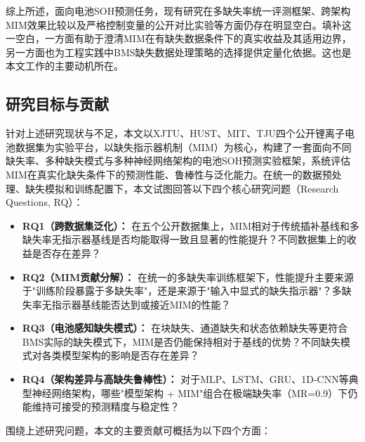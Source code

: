\documentclass[10pt,a4paper]{ctexart}
\begin{document}
综上所述，面向电池SOH预测任务，现有研究在多缺失率统一评测框架、跨架构MIM效果比较以及严格控制变量的公开对比实验等方面仍存在明显空白。填补这一空白，一方面有助于澄清MIM在有缺失数据条件下的真实收益及其适用边界，另一方面也为工程实践中BMS缺失数据处理策略的选择提供定量化依据。这也是本文工作的主要动机所在。

\subsection{研究目标与贡献}

针对上述研究现状与不足，本文以XJTU、HUST、MIT、TJU四个公开锂离子电池数据集为实验平台，以缺失指示器机制（MIM）为核心，构建了一套面向不同缺失率、多种缺失模式与多种神经网络架构的电池SOH预测实验框架，系统评估MIM在真实化缺失条件下的预测性能、鲁棒性与泛化能力。在统一的数据预处理、缺失模拟和训练配置下，本文试图回答以下四个核心研究问题（Research Questions, RQ）：

\begin{itemize}[leftmargin=2em]
    \item \textbf{RQ1（跨数据集泛化）：} 在五个公开数据集上，MIM相对于传统插补基线和多缺失率无指示器基线是否均能取得一致且显著的性能提升？不同数据集上的收益是否存在差异？
    
    \item \textbf{RQ2（MIM贡献分解）：} 在统一的多缺失率训练框架下，性能提升主要来源于"训练阶段暴露于多缺失率"，还是来源于"输入中显式的缺失指示器"？多缺失率无指示器基线能否达到或接近MIM的性能？
    
    \item \textbf{RQ3（电池感知缺失模式）：} 在块缺失、通道缺失和状态依赖缺失等更符合BMS实际的缺失模式下，MIM是否仍能保持相对于基线的优势？不同缺失模式对各类模型架构的影响是否存在差异？
    
    \item \textbf{RQ4（架构差异与高缺失鲁棒性）：} 对于MLP、LSTM、GRU、1D-CNN等典型神经网络架构，哪些"模型架构 + MIM"组合在极端缺失率（MR=0.9）下仍能维持可接受的预测精度与稳定性？
\end{itemize}

围绕上述研究问题，本文的主要贡献可概括为以下四个方面：
\end{document}
